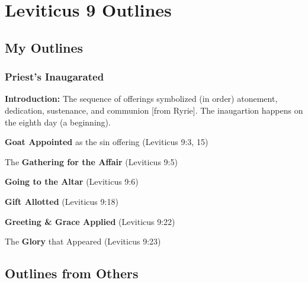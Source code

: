 \section{Leviticus 9 Outlines}

\subsection{My Outlines}

\subsubsection{Priest's Inaugarated}
\textbf{Introduction: }The sequence of offerings symbolized (in order) atonement, dedication, sustenance, and communion [from Ryrie]. The inaugartion happens on the eighth day (a beginning).
\begin{compactenum}[I.][7]
    \item \textbf{Goat Appointed} as the sin offering (Leviticus 9:3, 15)
    \item The \textbf{Gathering for the Affair} (Leviticus 9:5)
    \item \textbf{Going to the Altar} (Leviticus 9:6)
    \item \textbf{Gift Allotted} (Leviticus 9:18)
     \item \textbf{Greeting \& Grace Applied} (Leviticus 9:22)
   \item The \textbf{Glory} that Appeared (Leviticus 9:23)
\end{compactenum}

\subsection{Outlines from Others}